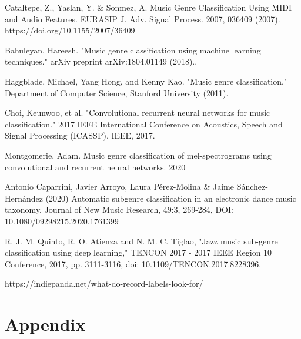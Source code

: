 \documentclass[letterpaper, 12 pt, conference]{ieeeconf}  %
\begin{document}
\begin{thebibliography}{99}



 Cataltepe, Z., Yaslan, Y. & Sonmez, A. Music Genre Classification Using MIDI and Audio Features. EURASIP J. Adv. Signal Process. 2007, 036409 (2007). https://doi.org/10.1155/2007/36409

 Bahuleyan, Hareesh. "Music genre classification using machine learning techniques." arXiv preprint arXiv:1804.01149 (2018)..

 Haggblade, Michael, Yang Hong, and Kenny Kao. "Music genre classification." Department of Computer Science, Stanford University (2011). 

 Choi, Keunwoo, et al. "Convolutional recurrent neural networks for music classification." 2017 IEEE International Conference on Acoustics, Speech and Signal Processing (ICASSP). IEEE, 2017.


 Montgomerie, Adam.  Music genre classification of mel-spectrograms using convolutional and
recurrent neural networks. 2020

  Antonio Caparrini, Javier Arroyo, Laura Pérez-Molina & Jaime Sánchez-Hernández (2020) Automatic subgenre classification in an electronic dance music taxonomy, Journal of New Music Research, 49:3, 269-284, DOI: 10.1080/09298215.2020.1761399



 R. J. M. Quinto, R. O. Atienza and N. M. C. Tiglao, "Jazz music sub-genre classification using deep learning," TENCON 2017 - 2017 IEEE Region 10 Conference, 2017, pp. 3111-3116, doi: 10.1109/TENCON.2017.8228396.


 https://indiepanda.net/what-do-record-labels-look-for/


\end{thebibliography}

\newpage
\section{Appendix}
\end{document}
